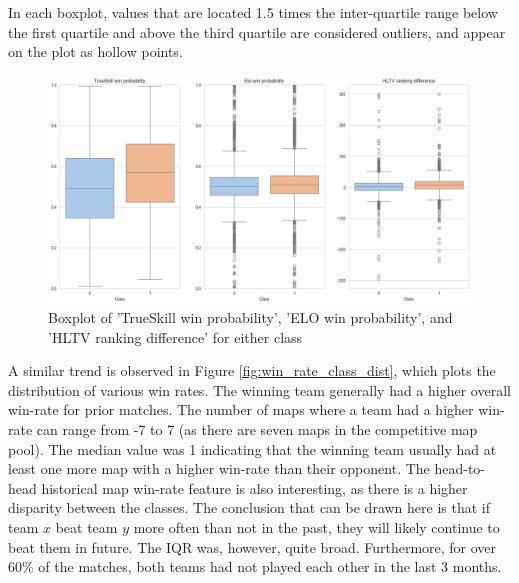 In each boxplot, values that are located 1.5 times the inter-quartile range below the first quartile and above the third quartile are considered outliers, and appear on the plot as hollow points.

\begin{figure}[h]
	\centering
	\begin{adjustbox}{center}
			\includegraphics[width=1.2\textwidth]{Figures/class-box-new-1.png}
	\end{adjustbox}
	\caption{Boxplot of 'TrueSkill win probability', 'ELO win probability', and 'HLTV ranking difference' for either class}
	\label{fig:win_prob_class_dist}
\end{figure}

A similar trend is observed in Figure \ref{fig:win_rate_class_dist}, which plots the distribution of various win rates. The winning team generally had a higher overall win-rate for prior matches. The number of maps where a team had a higher win-rate can range from -7 to 7 (as there are seven maps in the competitive map pool). The median value was 1 indicating that the winning team usually had at least one more map with a higher win-rate than their opponent. The head-to-head historical map win-rate feature is also interesting, as there is a higher disparity between the classes. The conclusion that can be drawn here is that if team $x$ beat team $y$ more often than not in the past, they will likely continue to beat them in future. The IQR was, however, quite broad. Furthermore, for over 60\% of the matches, both teams had not played each other in the last 3 months.

